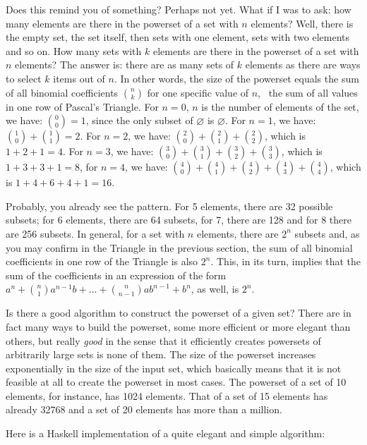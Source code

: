 \documentclass{scrreprt}
\begin{document}
Does this remind you of something?
Perhaps not yet.
What if I was to ask: 
how many elements are there 
in the powerset of a set with $n$ elements?
Well, there is the empty set,
the set itself,
then sets with one element,
sets with two elements
and so on.
How many sets with $k$ elements
are there in the powerset of a set with $n$ elements?
The answer is: 
there are as many sets of $k$ elements
as there are ways to select $k$ items out of $n$.
In other words, 
the size of the powerset equals 
the sum of all binomial coefficients 
$\binom{n}{k}$ for one specific value of $n$,
\ie\ the sum of all values 
in one row of Pascal's Triangle.
For $n=0$, $n$ is the number of elements of the set,
we have: $\binom{0}{0} = 1$,
since the only subset of $\varnothing$ is $\varnothing$.
For $n=1$, we have: $\binom{1}{0} + \binom{1}{1} = 2$.
For $n=2$, we have:
$\binom{2}{0} + \binom{2}{1} + \binom{2}{2}$,
which is $1 + 2 + 1 = 4$.
For $n=3$, we have:
$\binom{3}{0} + \binom{3}{1} + \binom{3}{2} + \binom{3}{3}$,
which is $1 + 3 + 3 + 1 = 8$,
for $n=4$, we have:
$\binom{4}{0} + \binom{4}{1} + \binom{4}{2} + \binom{4}{3} + \binom{4}{4}$,
which is $1 + 4 + 6 + 4 + 1 = 16$.

Probably, you already see  the pattern.
For 5 elements, there are 32 possible subsets;
for 6 elements, there are 64 subsets,
for 7, there are 128 and for 8 there are 256 subsets.
In general,
for a set with $n$ elements,
there are $2^n$ subsets and,
as you may confirm in the Triangle in the previous section,
the sum of all binomial coefficients in one row of the Triangle
is also $2^n$.
This, in its turn, implies that the sum
of the coefficients in an expression of the form 
$a^n + \binom{n}{1}a^{n-1}b + \dots + \binom{n}{n-1}ab^{n-1} + b^n$,
as well, is $2^n$.

Is there a good algorithm 
to construct the powerset of a given set?
There are in fact many ways to build the powerset,
some more efficient or more elegant than others,
but really \emph{good} in the sense
that it efficiently creates powersets
of arbitrarily large sets
is none of them.
The size of the powerset 
increases exponentially in the size
of the input set, which basically means
that it is not feasible at all to 
create the powerset in most cases.
The powerset of a set of 10 elements,
for instance, has \num{1024} elements.
That of a set of 15 elements
has already \num{32768}
and a set of 20 elements has more than a million.

Here is a Haskell implementation
of a quite elegant and simple algorithm:
\end{document}
